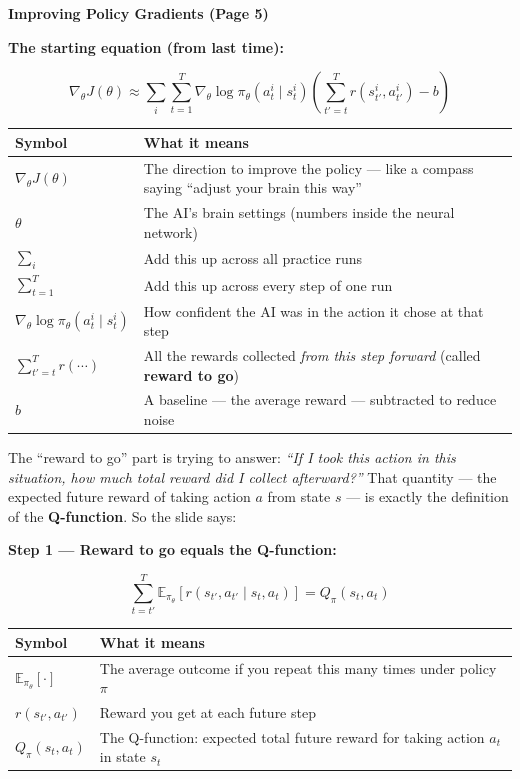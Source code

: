 \bigskip


\textbf{Improving Policy Gradients (Page 5)}

\medskip

\textbf{The starting equation (from last time):}

\[
\nabla_\theta J(\theta) \approx \sum_i \sum_{t=1}^{T} \nabla_\theta \log\pi_\theta(a_t^i \mid s_t^i) \left( \sum_{t'=t}^{T} r(s_{t'}^i, a_{t'}^i) - b \right)
\]

\begin{center}
\begin{tabular}{ll}
\hline
Symbol & What it means \\
\hline
$\nabla_\theta J(\theta)$ & The direction to improve the policy --- like a compass saying ``adjust your brain this way'' \\
$\theta$ & The AI's brain settings (numbers inside the neural network) \\
$\sum_i$ & Add this up across all practice runs \\
$\sum_{t=1}^{T}$ & Add this up across every step of one run \\
$\nabla_\theta \log\pi_\theta(a_t^i \mid s_t^i)$ & How confident the AI was in the action it chose at that step \\
$\sum_{t'=t}^{T} r(\cdots)$ & All the rewards collected \textit{from this step forward} (called \textbf{reward to go}) \\
$b$ & A baseline --- the average reward --- subtracted to reduce noise \\
\hline
\end{tabular}
\end{center}

The ``reward to go'' part is trying to answer: \textit{``If I took this action in this situation, how much total reward did I collect afterward?''} That quantity --- the expected future reward of taking action $a$ from state $s$ --- is exactly the definition of the \textbf{Q-function}. So the slide says:

\medskip

\textbf{Step 1 --- Reward to go equals the Q-function:}

\[
\sum_{t=t'}^{T} \mathbb{E}_{\pi_\theta}[r(s_{t'}, a_{t'} \mid s_t, a_t)] = Q_\pi(s_t, a_t)
\]

\begin{center}
\begin{tabular}{ll}
\hline
Symbol & What it means \\
\hline
$\mathbb{E}_{\pi_\theta}[\cdot]$ & The average outcome if you repeat this many times under policy $\pi$ \\
$r(s_{t'}, a_{t'})$ & Reward you get at each future step \\
$Q_\pi(s_t, a_t)$ & The Q-function: expected total future reward for taking action $a_t$ in state $s_t$ \\
\hline
\end{tabular}
\end{center}

